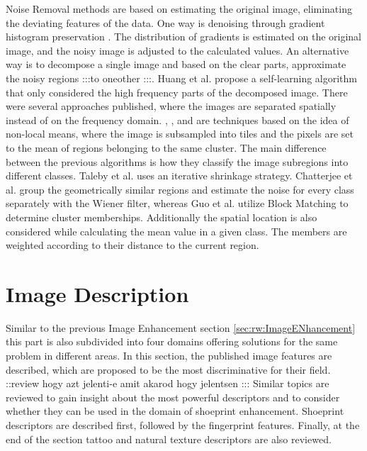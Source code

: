 \documentclass[draft,final]{vutinfth} %
\begin{document}
Noise Removal methods are based on estimating the original image, eliminating the deviating features of the data.
One way is denoising through gradient histogram preservation \cite{zuo2013texture}.
The distribution of gradients is estimated on the original image, and the noisy image is adjusted to the calculated values.
An alternative way is to decompose a single image and based on the clear parts, approximate the noisy regions :::to oneother :::.
Huang et al. \cite{huang2013self} propose a self-learning algorithm that only considered the high frequency parts of the decomposed image.
There were several approaches published, where the images are separated spatially instead of on the frequency domain.
\cite{xu2015patch}, \cite{talebi2013global}, \cite{chatterjee2011patch} and \cite{guo2015efficient} are techniques based on the idea of non-local means, where the image is subsampled into tiles and the pixels are set to the mean of regions belonging to the same cluster.
The main difference between the previous algorithms is how they classify the image subregions into different classes.
Taleby et al. \cite{talebi2013global} uses an iterative shrinkage strategy. 
Chatterjee et al.  \cite{chatterjee2011patch} group the geometrically similar regions and estimate the noise for every class separately with the Wiener filter, whereas Guo et al. \cite{guo2015efficient} utilize Block Matching to determine cluster memberships. 
Additionally the spatial location is also considered while calculating the mean value in a given class.
The members are weighted according to their distance to the current region.

\section{Image Description}

Similar to the previous Image Enhancement section \ref{sec:rw:ImageENhancement} this part is also subdivided into four domains offering solutions for the same problem in different areas.
In this section, the published image features are described, which are proposed to be the most discriminative for their field. ::review hogy azt jelenti-e amit akarod hogy jelentsen :::
Similar topics are reviewed to gain insight about the most powerful descriptors and to consider whether they can be used in the domain of shoeprint enhancement.
Shoeprint descriptors are described first, followed by the fingerprint features.
Finally, at the end of the section tattoo and natural texture descriptors are also reviewed. 
\end{document}

